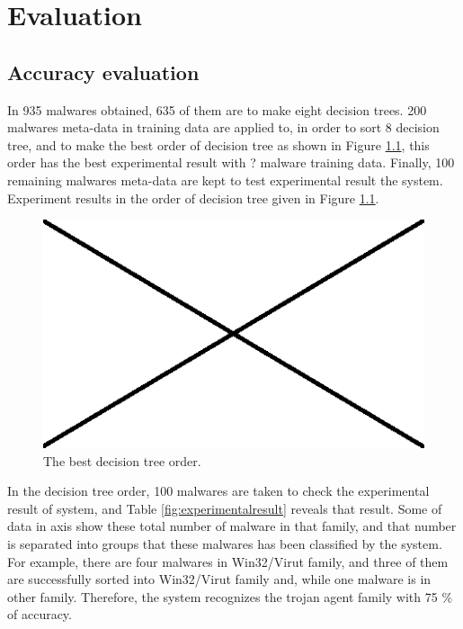 \chapter{Evaluation}\label{chap:6}


\section{Accuracy evaluation}
In 935 malwares obtained, 635 of them are to make eight decision trees. 200 malwares meta-data in training data are applied to, in order to sort $8$ decision tree, and to make the best order of decision tree as shown in Figure \ref{fig:ordertree}, this order has the best experimental result with ? malware training data. 
Finally, 100 remaining malwares meta-data are kept to test experimental result the system.
Experiment results in the order of decision tree given	 in Figure \ref{fig:ordertree}.
\begin{figure}[httb]
  \centering
    \includegraphics[width=1\textwidth]{graph/ordertree.jpg}
     \caption{The best decision tree order.}
     \label{fig:ordertree}
\end{figure}

In the decision tree order, 100 malwares are taken to check the experimental result of system, and Table \ref{fig:experimentalresult} reveals that result. Some of data in axis show these total number of malware in that family, and that number is separated into groups that these malwares has been classified by the system. For example, there are four malwares in Win32/Virut family, and three of them are successfully sorted into Win32/Virut family and, while one malware is in other family. Therefore, the system recognizes the trojan agent family with 75 \% of accuracy.\\
\\

